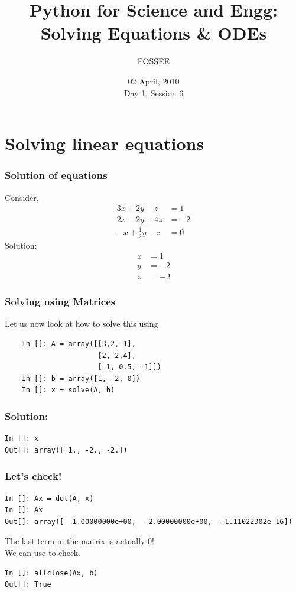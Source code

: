 \documentclass[14pt,compress]{beamer}
\title[Solving Equations \& ODEs]{Python for Science and Engg:\\Solving Equations \& ODEs}
\author[FOSSEE] {FOSSEE}
\institute[IIT Bombay] {Department of Aerospace Engineering\\IIT Bombay}
\date[] {02 April, 2010\\Day 1, Session 6}
\newcounter{time}
\newcommand{\inctime}[1]{\addtocounter{time}{#1}{\tiny \thetime\ m}}
\newcommand{\kwrd}[1]{ \texttt{\textbf{\color{blue}{#1}}}  }
\begin{document}
\begin{frame}
  \maketitle
\end{frame}


\section{Solving linear equations}

\begin{frame}[fragile]
\frametitle{Solution of equations}
Consider,
  \begin{align*}
    3x + 2y - z  & = 1 \\
    2x - 2y + 4z  & = -2 \\
    -x + \frac{1}{2}y -z & = 0
  \end{align*}
Solution:
  \begin{align*}
    x & = 1 \\
    y & = -2 \\
    z & = -2
  \end{align*}
\end{frame}

\begin{frame}[fragile]
\frametitle{Solving using Matrices}
Let us now look at how to solve this using \kwrd{matrices}
  \begin{lstlisting}
    In []: A = array([[3,2,-1],
                      [2,-2,4],                   
                      [-1, 0.5, -1]])
    In []: b = array([1, -2, 0])
    In []: x = solve(A, b)
  \end{lstlisting}
\end{frame}

\begin{frame}[fragile]
\frametitle{Solution:}
\begin{lstlisting}
In []: x
Out[]: array([ 1., -2., -2.])
\end{lstlisting}
\end{frame}

\begin{frame}[fragile]
\frametitle{Let's check!}
\begin{lstlisting}
In []: Ax = dot(A, x)
In []: Ax
Out[]: array([  1.00000000e+00,  -2.00000000e+00,  -1.11022302e-16])
\end{lstlisting}
\begin{block}{}
The last term in the matrix is actually \alert{0}!\\
We can use \kwrd{allclose()} to check.
\end{block}
\begin{lstlisting}
In []: allclose(Ax, b)
Out[]: True
\end{lstlisting}
\inctime{15}
\end{frame}
\end{document}
